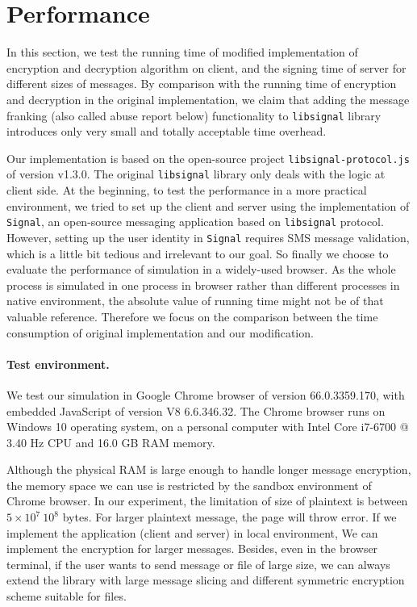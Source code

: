 
\section{Performance}
In this section, we test the running time of modified implementation of encryption and decryption algorithm on client,
and the signing time of server for different sizes of messages.
By comparison with the running time of encryption and decryption in the original implementation,
we claim that adding the message franking (also called abuse report below) functionality to \texttt{libsignal} library introduces only very small and totally acceptable time overhead. 


Our implementation is based on the open-source project \texttt{libsignal-protocol.js} of version v1.3.0.
The original \texttt{libsignal} library only deals with the logic at client side.
At the beginning, to test the performance in a more practical environment,
we tried to set up the client and server using the implementation of \texttt{Signal}, an open-source messaging application based on \texttt{libsignal} protocol.
However, setting up the user identity in \texttt{Signal} requires SMS message validation,
which is a little bit tedious and irrelevant to our goal.
So finally we choose to evaluate the performance of simulation in a widely-used browser.
As the whole process 
is simulated in one process in browser rather than different processes in native environment,
the absolute value of running time might not be of that valuable reference.
Therefore we focus on the comparison between the time consumption of original implementation and our modification.



\paragraph{Test environment.}
We test our simulation in Google Chrome browser of version 66.0.3359.170,
with embedded JavaScript of version V8 6.6.346.32.
The Chrome browser runs on Windows 10 operating system,
on a personal computer with Intel Core i7-6700 @ 3.40 Hz CPU and 16.0 GB RAM memory.


Although the physical RAM is large enough to handle longer message encryption,
the memory space we can use is restricted by the sandbox environment of Chrome browser.
In our experiment, the limitation of size of plaintext is between $5 \times 10^7 ~ 10^8$ bytes.
For larger plaintext message, the page will throw error.
If we implement the application (client and server) in local environment,
We can implement the encryption for larger messages.
Besides, even in the browser terminal,
if the user wants to send message or file of large size,
we can always extend the library with large message slicing and different symmetric encryption scheme suitable for files.

